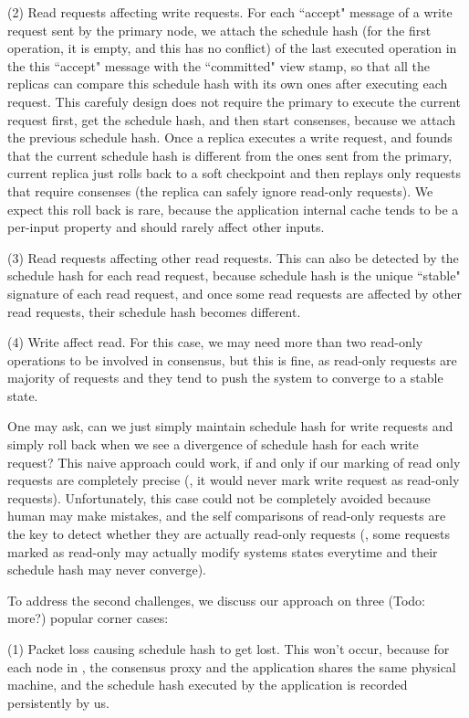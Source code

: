 (2) Read requests affecting write requests. For each ``accept" message of a 
write request sent by the \paxos primary node, we attach the schedule hash (for 
the first operation, it is empty, and this has no conflict) of 
the last executed operation in the this ``accept" message with the ``committed" 
view stamp, so that all the replicas can compare this schedule hash with its 
own ones after executing each request. This carefuly design does not require 
the primary to execute the current request first, get the schedule hash, and 
then start consenses, because we attach the previous schedule hash. Once a 
replica executes a write request, and founds that the current schedule hash is 
different from the ones sent from the primary, current replica just rolls back 
to a soft checkpoint and then replays only requests that require consenses (the 
replica can safely ignore read-only requests). We expect this roll back is 
rare, because the application internal cache tends to be a per-input property 
and should rarely affect other inputs.

(3) Read requests affecting other read requests. This can also be detected by 
the schedule hash for each read request, because schedule hash is the unique ``stable" 
signature of each read request, and once some read requests are affected by 
other read requests, their schedule hash becomes different.

(4) Write affect read. For this case, we may need more than two read-only 
operations to be involved in consensus, but this is fine, as read-only requests 
are majority of requests and they tend to push the system to converge to a 
stable state.

One may ask, can we just simply maintain schedule hash for write requests and 
simply roll back when we see a divergence of schedule hash for each write 
request? This naive approach could work, if and only if our marking of read 
only requests are completely precise (\ie, it would never mark write request as 
read-only requests). Unfortunately, this case could not be completely avoided 
because human may make mistakes, and the self comparisons of read-only requests 
are the key to detect whether they are actually read-only requests (\eg, some 
requests marked as read-only may actually modify systems states everytime and 
their schedule hash may never converge).

To address the second challenges, we discuss our approach on three (Todo: more?) popular 
corner cases:

(1) Packet loss causing schedule hash to get lost. This won't occur, because 
for each node in \msmr, the consensus proxy and the application shares the same 
physical machine, and the schedule hash executed by the application is recorded 
persistently by us.


